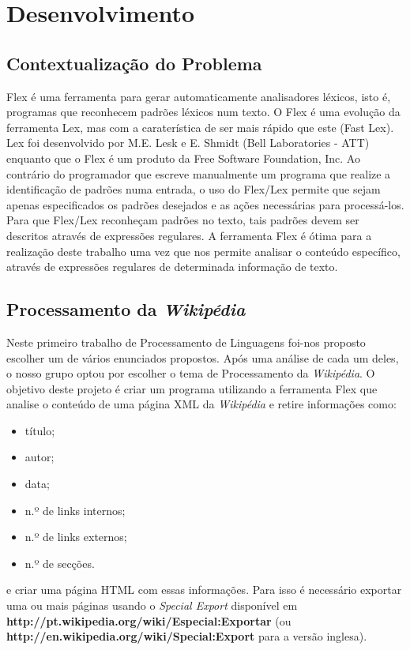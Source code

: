 \documentclass[11pt, a4paper, oneside]{article}
\begin{document}
\newpage
\section{Desenvolvimento}

\subsection{Contextualização do Problema}

Flex é uma ferramenta para gerar automaticamente analisadores léxicos, isto é, programas que reconhecem padrões léxicos num texto. O Flex é uma evolução da ferramenta Lex, mas com a caraterística de ser mais rápido que este (Fast Lex). Lex foi desenvolvido por M.E. Lesk e E. Shmidt (Bell Laboratories - ATT) enquanto que o Flex é um produto da Free Software Foundation, Inc. Ao contrário do programador que escreve manualmente um programa que realize a identificação de padrões numa entrada, o uso do Flex/Lex permite que sejam apenas especificados os padrões desejados e as ações necessárias para processá-los. Para que Flex/Lex reconheçam padrões no texto, tais padrões devem ser descritos através de expressões regulares. A ferramenta Flex é ótima para a realização deste trabalho uma vez que nos permite analisar o conteúdo específico, através de expressões regulares de determinada informação de texto.

\subsection{Processamento da \textit{Wikipédia}}
Neste primeiro trabalho de Processamento de Linguagens foi-nos proposto escolher um de vários enunciados propostos. Após uma análise de cada um deles, o nosso grupo optou por escolher o tema de Processamento da \textit{Wikipédia}. O objetivo deste projeto é criar um programa utilizando a ferramenta Flex que analise o conteúdo de uma página XML da \textit{Wikipédia} e retire informações como:
\begin{itemize}
\item título;
\item autor;
\item data;
\item n.º de links internos;
\item n.º de links externos;
\item n.º de secções.
\end{itemize}
e criar uma página HTML com essas informações. Para isso é necessário exportar uma ou mais páginas usando o \textit{Special Export} disponível em \\\textbf{http://pt.wikipedia.org/wiki/Especial:Exportar} (ou \\\textbf{http://en.wikipedia.org/wiki/Special:Export} para a versão inglesa).
\end{document}

